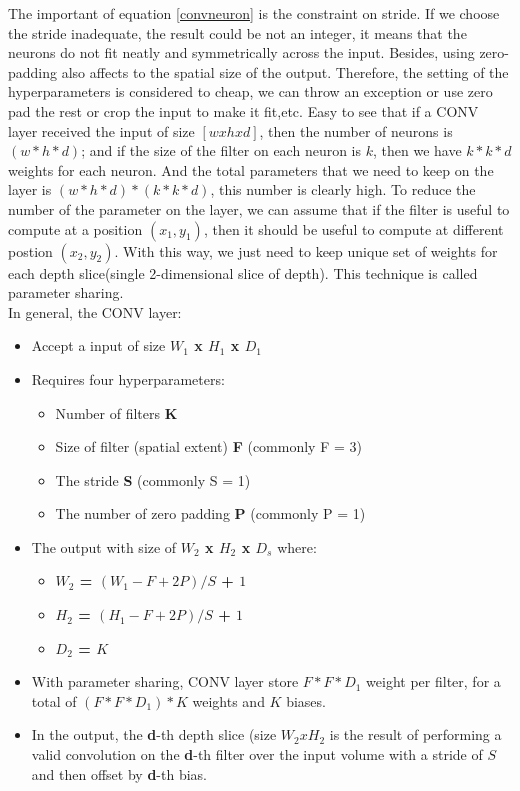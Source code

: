 The important of equation \ref{convneuron} is the constraint on stride. If we choose the stride inadequate, the result could be not an integer, it means that the neurons do not fit neatly and symmetrically across the input. Besides, using zero-padding also affects to the spatial size of the output. Therefore, the setting of the hyperparameters is considered to cheap, we can throw an exception or use zero pad the rest or crop the input to make it fit,etc. 
Easy to see that if a CONV layer received the input of size $[w x h x d]$, then the number of neurons is $(w * h * d)$; and if the size of the filter on each neuron is $k$, then we have $k * k * d$ weights for each neuron. And the total parameters that we need to keep on the layer is $(w * h * d) * (k * k * d)$, this number is clearly high. To reduce the number of the parameter on the layer, we can assume that if the filter is useful to compute at a position $(x_1,y_1)$, then it should be useful to compute at different postion $(x_2,y_2)$. With this way, we just need to keep unique set of weights for each depth slice(single 2-dimensional slice of depth). This technique is called parameter sharing.\\[0.2cm]
In general, the CONV layer:
\begin{itemize}
	\item Accept a input of size \textbf{$W_1$ x $H_1$ x $D_1$}
	\item Requires four hyperparameters:
		\begin{itemize}
			\item Number of filters \textbf{K}
			\item Size of filter (spatial extent) \textbf{F} (commonly F = 3)
			\item The stride \textbf{S} (commonly S = 1)
			\item The number of zero padding \textbf{P} (commonly P = 1)
		\end{itemize}
	\item The output with size of \textbf{$W_2$ x $H_2$ x $D_s$} where:
		\begin{itemize}
			\item \textbf{$W_2$ = $(W_1 - F + 2P)/S$ + $1$}
			\item \textbf{$H_2$ = $(H_1 - F + 2P)/S$ + $1$}
			\item \textbf{$D_2$ = $K$}
		\end{itemize}
	\item With parameter sharing, CONV layer store \textbf{$F * F * D_1$} weight per filter, for a total of \textbf{$(F * F * D_1) * K$} weights and \textbf{$K$} biases.
	\item In the output, the \textbf{d}-th depth slice (size \textbf{$W_2 x H_2$} is the result of performing a valid convolution on the \textbf{d}-th filter over the input volume with a stride of \textbf{$S$} and then offset by \textbf{d}-th bias.
\end{itemize}
